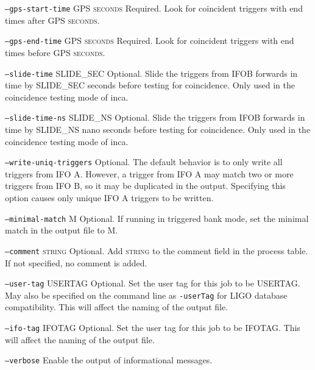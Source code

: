 \begin{entry}
\begin{entry}
\item[\texttt{--gps-start-time} \textsc{GPS seconds}] Required.  Look
for coincident triggers with end times after \textsc{GPS seconds}.

\item[\texttt{--gps-end-time} \textsc{GPS seconds}] Required.  Look for
coincident triggers with end times before \textsc{GPS seconds}.

\item[\texttt{--slide-time}] \textsc{SLIDE\_SEC} Optional.  Slide the
triggers from \textsc{IFOB} forwards in time by  \textsc{SLIDE\_SEC}
seconds before testing for coincidence.  Only used in the coincidence
testing mode of inca.

\item[\texttt{--slide-time-ns}] \textsc{SLIDE\_NS} Optional.  Slide the
triggers from \textsc{IFOB} forwards in time by  \textsc{SLIDE\_NS} nano
seconds before testing for coincidence.  Only used in the coincidence
testing mode of inca.

\item[\texttt{--write-uniq-triggers}] Optional.  The default behavior is
to only write all triggers from IFO A. However, a trigger from IFO A may
match two or more triggers from IFO B, so it may be duplicated in the
output. Specifying this option causes only unique IFO A triggers to be
written.

\item[\texttt{--minimal-match} \textsc{M}] Optional.  If running in triggered
bank mode, set the minimal match in the output file to \textsc{M}.

\item[\texttt{--comment} \textsc{string}] Optional. Add \textsc{string}
to the comment field in the process table. If not specified, no comment
is added. 

\item[\texttt{--user-tag} \textsc{USERTAG}] Optional. Set the user tag
for this job to be \textsc{USERTAG}. May also be specified on the command
line as \texttt{-userTag} for LIGO database compatibility.  This will
affect the naming of the output file.

\item[\texttt{--ifo-tag} \textsc{IFOTAG}] Optional. Set the user tag for
this job to be \textsc{IFOTAG}.  This will affect the naming of the
output file.

\item[\texttt{--verbose}] Enable the output of informational messages.



\end{entry}
\end{entry}
